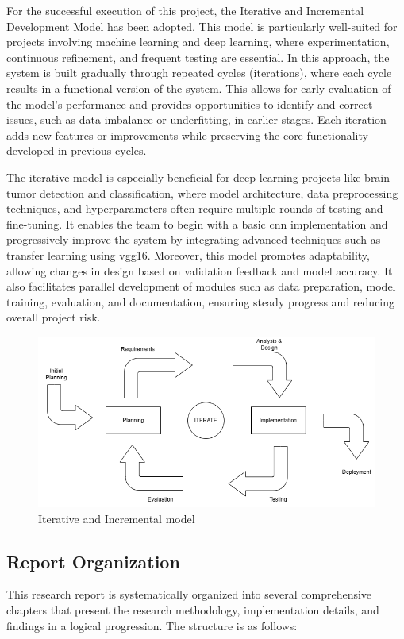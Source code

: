 For the successful execution of this project, the Iterative and Incremental Development Model has been adopted. This model is particularly well-suited for projects involving machine learning and deep learning, where experimentation, continuous refinement, and frequent testing are essential. In this approach, the system is built gradually through repeated cycles (iterations), where each cycle results in a functional version of the system. This allows for early evaluation of the model's performance and provides opportunities to identify and correct issues, such as data imbalance or underfitting, in earlier stages. Each iteration adds new features or improvements while preserving the core functionality developed in previous cycles.

The iterative model is especially beneficial for deep learning projects like brain tumor detection and classification, where model architecture, data preprocessing techniques, and hyperparameters often require multiple rounds of testing and fine-tuning. It enables the team to begin with a basic \gls{cnn} implementation and progressively improve the system by integrating advanced techniques such as transfer learning using \gls{vgg16}. Moreover, this model promotes adaptability, allowing changes in design based on validation feedback and model accuracy. It also facilitates parallel development of modules such as data preparation, model training, evaluation, and documentation, ensuring steady progress and reducing overall project risk.
\begin{figure}[h]
    \centering
    \includegraphics[width=1\linewidth]{Images/model.png}
    \caption{Iterative and Incremental model}
    \label{fig:enter-label}
\end{figure}

\subsection{Report Organization}
This research report is systematically organized into several comprehensive
chapters that present the research methodology, implementation details, and
findings in a logical progression. The structure is as follows:

